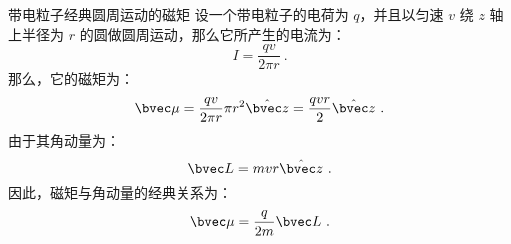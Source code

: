 \begin{example}{带电粒子经典圆周运动的磁矩}\label{ex_MagMom_1}
设一个带电粒子的电荷为 $q$，并且以匀速 $v$ 绕 $z$ 轴上半径为 $r$ 的圆做圆周运动，那么它所产生的电流为：
\begin{equation}
I=\frac{qv}{2\pi r}~.
\end{equation}
那么，它的磁矩为：
\begin{equation}
\bvec\mu  = \frac{qv}{2\pi r}\pi r^2 \hat{\bvec z}=\frac{qvr}{2} \hat{\bvec z} ~.
\end{equation}
由于其角动量为：
\begin{equation}
\bvec L =mvr\hat{\bvec z}~.
\end{equation}
因此，磁矩与角动量的经典关系为：
\begin{equation}
\bvec\mu  = \frac{q}{2m}\bvec L~.
\end{equation}

\end{example}

